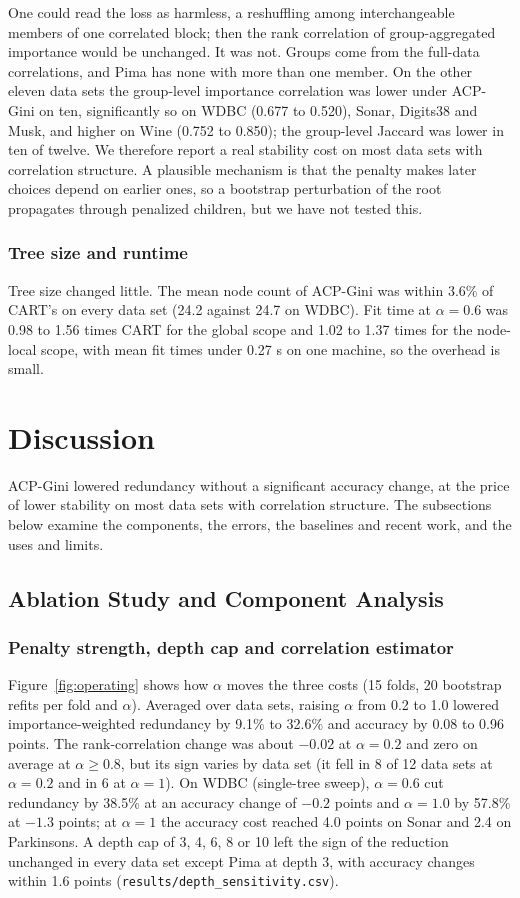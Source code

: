 \documentclass[pdflatex,sn-basic,Numbered]{sn-jnl}
\begin{document}
One could read the loss as harmless, a reshuffling among interchangeable members of one correlated block; then the rank correlation of group-aggregated importance would be unchanged. It was not. Groups come from the full-data correlations, and Pima has none with more than one member. On the other eleven data sets the group-level importance correlation was lower under ACP-Gini on ten, significantly so on WDBC (0.677 to 0.520), Sonar, Digits38 and Musk, and higher on Wine (0.752 to 0.850); the group-level Jaccard was lower in ten of twelve. We therefore report a real stability cost on most data sets with correlation structure. A plausible mechanism is that the penalty makes later choices depend on earlier ones, so a bootstrap perturbation of the root propagates through penalized children, but we have not tested this.


\subsubsection{Tree size and runtime}
Tree size changed little. The mean node count of ACP-Gini was within 3.6\% of CART's on every data set (24.2 against 24.7 on WDBC). Fit time at $\alpha=0.6$ was 0.98 to 1.56 times CART for the global scope and 1.02 to 1.37 times for the node-local scope, with mean fit times under 0.27 s on one machine, so the overhead is small.

\section{Discussion}
ACP-Gini lowered redundancy without a significant accuracy change, at the price of lower stability on most data sets with correlation structure. The subsections below examine the components, the errors, the baselines and recent work, and the uses and limits.

\subsection{Ablation Study and Component Analysis}
\subsubsection{Penalty strength, depth cap and correlation estimator}
Figure~\ref{fig:operating} shows how $\alpha$ moves the three costs (15 folds, 20 bootstrap refits per fold and $\alpha$). Averaged over data sets, raising $\alpha$ from 0.2 to 1.0 lowered importance-weighted redundancy by 9.1\% to 32.6\% and accuracy by 0.08 to 0.96 points. The rank-correlation change was about $-0.02$ at $\alpha=0.2$ and zero on average at $\alpha\ge0.8$, but its sign varies by data set (it fell in 8 of 12 data sets at $\alpha=0.2$ and in 6 at $\alpha=1$). On WDBC (single-tree sweep), $\alpha=0.6$ cut redundancy by 38.5\% at an accuracy change of $-0.2$ points and $\alpha=1.0$ by 57.8\% at $-1.3$ points; at $\alpha=1$ the accuracy cost reached 4.0 points on Sonar and 2.4 on Parkinsons. A depth cap of 3, 4, 6, 8 or 10 left the sign of the reduction unchanged in every data set except Pima at depth 3, with accuracy changes within 1.6 points (\texttt{results/depth\_sensitivity.csv}).
\end{document}
